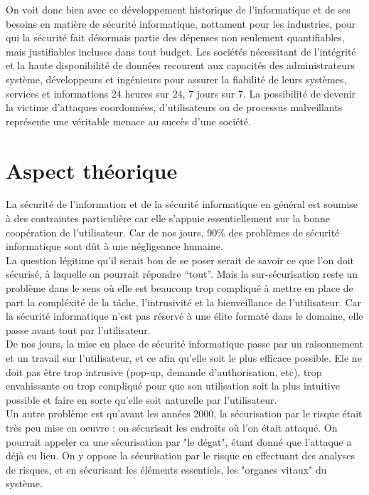 \documentclass[a4paper]{memoir}
\begin{document}
On voit donc bien avec ce développement historique de l'informatique et de ses besoins en matière de sécurité informatique, nottament pour les industries, pour qui la sécurité fait désormais partie des dépenses non seulement quantifiables, mais justifiables incluses dans tout budget. Les sociétés nécessitant de l'intégrité et la haute disponibilité de données recourent aux capacités des administrateurs système, développeurs et ingénieurs pour assurer la fiabilité de leurs systèmes, services et informations 24 heures sur 24, 7 jours sur 7. La possibilité de devenir la victime d'attaques coordonnées, d'utilisateurs ou de processus malveillants représente une véritable menace au succès d'une société. 

\chapter{Aspect théorique}
 

La sécurité de l'information et de la sécurité informatique en général est soumise à des contraintes particulière car elle s'appuie essentiellement sur la bonne coopération de l'utilisateur. Car de nos jours, 90\% des problèmes de sécurité informatique sont dût à une négligeance humaine.\\
La question légitime qu'il serait bon de se poser serait de savoir ce que l'on doit sécurisé, à laquelle on pourrait répondre ``tout''. Mais la sur-sécurisation reste un problème dans le sens où elle est beaucoup trop compliqué à mettre en place de part la compléxité de la tâche, l'intrusivité et la bienveillance de l'utilisateur. Car la sécurité informatique n'est pas réservé à une élite formaté dans le domaine, elle passe avant tout par l'utilisateur.\\
De nos jours, la mise en place de sécurité informatique passe par un raisonnement et un travail sur l'utilisateur, et ce afin qu'elle soit le plus efficace possible. Ele ne doit pas être trop intrusive (pop-up, demande d'authorisation, etc), trop envahissante ou trop compliqué pour que son utilisation soit la plus intuitive possible et faire en sorte qu'elle soit naturelle par l'utilisateur.\\

Un autre problème est qu'avant les années 2000, la sécurisation par le risque était très peu mise en oeuvre : on sécurisait les endroits où l'on était attaqué. On pourrait appeler ca une sécurisation par "le dégat", étant donné que l'attaque a déjà eu lieu.
On y oppose la sécurisation par le risque en effectuant des analyses de risques, et en sécurisant les éléments essentiels, les "organes vitaux" du système.
\end{document}
